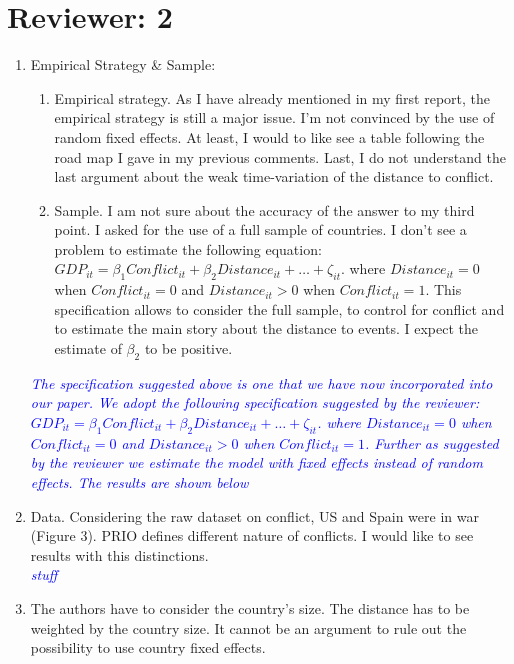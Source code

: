 \section*{Reviewer: 2}

\begin{enumerate}
\item Empirical Strategy \& Sample: 
\begin{enumerate}
	\item   Empirical strategy. As I have already mentioned in my first report, the empirical strategy is still a
	major issue. I’m not convinced by the use of random fixed effects. At least, I would to like see a
	table following the road map I gave in my previous comments. Last, I do not understand the last
	argument about the weak time-variation of the distance to conflict. \\

	\item Sample. I am not sure about the accuracy of the answer to my third point. I asked for the use of a
	full sample of countries. I don’t see a problem to estimate the following equation: $GDP_{it} = \beta_{1}Conflict_{it} + \beta_{2}Distance_{it}+\ldots+\zeta_{it}$. where $Distance_{it}=0$ when $Conflict_{it}=0$ and $Distance_{it}>0$ when $Conflict_{it}=1$. This specification allows to consider the full sample, to control for conflict and to estimate the main story about the distance to events. I expect the estimate of $\beta_{2}$ to be positive. \\
\end{enumerate}

\textcolor{blue}{\emph{
	The specification suggested above is one that we have now incorporated into our paper. We adopt the following specification suggested by the reviewer: $GDP_{it} = \beta_{1}Conflict_{it} + \beta_{2}Distance_{it}+\ldots+\zeta_{it}$. where $Distance_{it}=0$ when $Conflict_{it}=0$ and $Distance_{it}>0$ when $Conflict_{it}=1$. Further as suggested by the reviewer we estimate the model with fixed effects instead of random effects. The results are shown below
}} 

\item Data. Considering the raw dataset on conflict, US and Spain were in war (Figure 3). PRIO defines different nature of conflicts. I would like to see results with this distinctions. \\

\textcolor{blue}{\emph{
	stuff
}}

\item The authors have to consider the country’s size. The distance has to be weighted by the country size. It cannot be an argument to rule out the possibility to use country fixed effects. \\


\end{enumerate}
